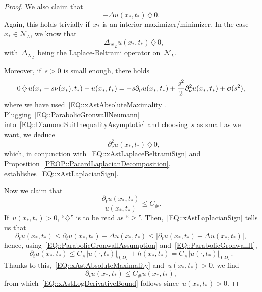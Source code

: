 \documentclass[12pt,a4paper]{amsart}
\numberwithin{equation}{section}
\theoremstyle{definition}
\theoremstyle{remark}
\newcommand{\abs}[1]{\left\lvert#1\right\rvert}
\newcommand{\smallo}{\mathchoice{{\scriptstyle\mathcal{O}}}{{\scriptstyle\mathcal{O}}}{{\scriptscriptstyle\mathcal{O}}}{\scalebox{.7}{$\scriptscriptstyle\mathcal{O}$}}}
\renewcommand{\leq}{\leqslant}
\renewcommand{\ge}{\geqslant}
\begin{document}
\begin{proof}
    We also claim that
    \begin{equation}\label{EQ::xAstLaplacianSign}
        -\Delta u(x_\ast, t_\ast) \,\diamondsuit\, 0.
    \end{equation}
    Again, this holds trivially if~$x_\ast$ is an interior maximizer/minimizer. In the case~$x_\ast \in \mathcal{N}_L$, we know that
    \begin{equation}\label{EQ::xAstLaplaceBeltramiSign}
        -\Delta_{\mathcal{N}_L} u(x_\ast,t_\ast) \,\diamondsuit\, 0,
    \end{equation}
    with~$\Delta_{\mathcal{N}_L}$ being the Laplace-Beltrami operator on~$\mathcal{N}_L$.
    
    Moreover, if~$s>0$ is small enough, there holds
    \begin{equation}\label{EQ::DiamondSuitInequalityAsymptotic}
        0 \,\diamondsuit\, u(x_\ast - s\nu(x_\ast), t_\ast) - u(x_\ast, t_\ast) = -s\partial_\nu u(x_\ast, t_\ast) + \frac{s^2}{2}\partial_\nu^2u(x_\ast, t_\ast) + \smallo(s^2),
    \end{equation}
    where we have used~\eqref{EQ::xAstAbsoluteMaximality}. Plugging~\eqref{EQ::ParabolicGronwallNeumann} into~\eqref{EQ::DiamondSuitInequalityAsymptotic} and choosing~$s$ as small as we want, we deduce
    \begin{equation}
        -\partial_\nu^2 u(x_\ast,t_\ast)\,\diamondsuit\,0,
    \end{equation}
    which, in conjunction with~\eqref{EQ::xAstLaplaceBeltramiSign} and Proposition~\ref{PROP::PacardLaplacianDecomposition}, establishes~\eqref{EQ::xAstLaplacianSign}.

    Now we claim that
    \begin{equation}\label{EQ::xAstLogDerivativeBound}
        \frac{\partial_t u(x_\ast,t_\ast)}{u(x_\ast,t_\ast)} \leq C_\#.
    \end{equation}
    If~$u(x_\ast, t_\ast) > 0$, ``$\diamondsuit$'' is to be read as ``$\ge$''. Then,~\eqref{EQ::xAstLaplacianSign} tells us that
    \begin{equation}
        \partial_t u(x_\ast,t_\ast) \leq \partial_t u(x_\ast,t_\ast) -\Delta u(x_\ast, t_\ast) \leq \abs{\partial_t u(x_\ast,t_\ast) -\Delta u(x_\ast, t_\ast)},
    \end{equation}
    hence, using~\eqref{EQ::ParabolicGronwallAssumption} and~\eqref{EQ::ParabolicGronwallH},
    \begin{equation}
        \partial_t u(x_\ast,t_\ast) \leq C_\#\abs{u(\cdot, t_\ast)}_{0; \Omega_L} + h(x_\ast,t_\ast) = C_\#\abs{u(\cdot, t_\ast)}_{0; \Omega_L}.
    \end{equation}
    Thanks to this,~\eqref{EQ::xAstAbsoluteMaximality} and~$u(x_\ast, t_\ast)>0$, we find
    \begin{equation}
        \partial_t u(x_\ast,t_\ast) \leq C_\# u(x_\ast, t_\ast),
    \end{equation}
    from which~\eqref{EQ::xAstLogDerivativeBound} follows since~$u(x_\ast, t_\ast) > 0$.


\end{proof}
\end{document}
